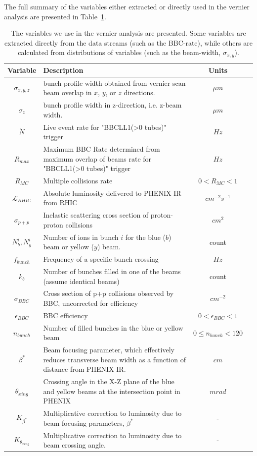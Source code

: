 {\noindent}The full summary of the variables either extracted or directly used
in the vernier analysis are presented in Table~\ref{tab:ana_vars}.

\begin{table}[ht]
  \centering
  \begin{tabular}{c p{9cm} c c }
    \toprule
    \textbf{Variable} & \textbf{Description} & \textbf{Units}  \\
    \midrule 
    $\sigma_{x,y,z} $ & bunch profile width obtained from vernier scan beam
    overlap in $x$, $y$, or $z$ directions. & $\mu m$  \\
    $\sigma_{z}$ & bunch profile width in z-direction, i.e. z-beam width. & $\mu
    m$ \\
    $\dot{N}$ & Live event rate for "BBCLL1(\textgreater0 tubes)" trigger & $Hz$
    \\
    $R_{max}$ & Maximum BBC Rate determined from maximum overlap of beams rate
    for "BBCLL1(\textgreater0 tubes)" trigger & $Hz$ \\
    $R_{MC}$ & Multiple collisions rate & $0 < R_{MC} < 1$ \\
    $\mathcal{L}_{RHIC}$ & Absolute luminosity delivered to PHENIX IR from RHIC
    & $cm^{-2}s^{-1}$ \\
    $\sigma_{p+p} $ & Inelastic scattering cross section of proton-proton
    collisions & $cm^{2}$ \\
    $N_{b}^{i},N_{y}^{i}$ & Number of ions in bunch $i$ for the blue ($b$) beam
    or yellow ($y$) beam. & count \\
    $f_{bunch}$ & Frequency of a specific bunch crossing & $Hz$ \\
    $k_{b}$ & Number of bunches filled in one of the beams (assume identical
    beams) & count \\
    $\sigma_{BBC}$ & Cross section of p+p collisions observed by BBC,
    uncorrected for efficiency & $cm^{-2}$ \\
    $\epsilon_{BBC}$ & BBC efficiency & $0 < \epsilon_{BBC} < 1 $ \\
    $n_{bunch}$ & Number of filled bunches in the blue or yellow beam & $0 \leq
    n_{bunch} < 120$ \\
    $\beta^*$ & Beam focusing parameter, which effectively reduces transverse
    beam width as a function of distance from PHENIX IR. & $cm$ \\
    $\theta_{xing}$ & Crossing angle in the X-Z plane of the blue and yellow
    beams at the intersection point in PHENIX & $mrad$ \\
    $K_{\beta^*}$ & Multiplicative correction to luminosity due to beam focusing
    parameters, $\beta^*$ & - \\
    $K_{\theta_{xing}}$ & Multiplicative correction to luminosity due to beam
    crossing angle.  & - \\
    \bottomrule
  \end{tabular}
  \caption{
    The variables we use in the vernier analysis are presented. Some variables
    are extracted directly from the data streams (such as the BBC-rate), while
    others are calculated from distributions of variables (such as the
    beam-width, $\sigma_{x,y}$). 
  }
  \label{tab:ana_vars}
\end{table}
